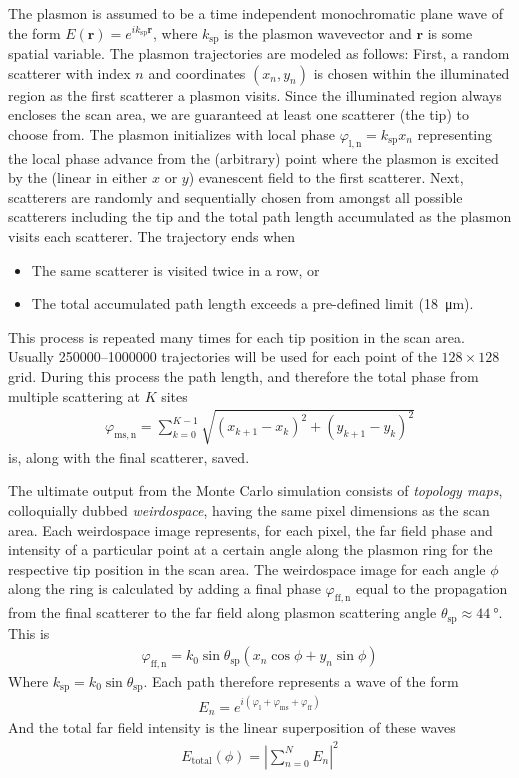 The plasmon is assumed to be a time independent monochromatic plane wave
of the form $E(\mathbf{r})=e^{ik_\mathrm{sp}\mathbf{r}}$, where
$k_\mathrm{sp}$ is the plasmon wavevector and $\mathbf{r}$ is some
spatial variable.  The plasmon trajectories are modeled as follows:
First, a random scatterer with index $n$ and coordinates $(x_n,y_n)$ is
chosen within the illuminated region as the first scatterer a plasmon
visits.  Since the illuminated region always encloses the scan area, we are
guaranteed at least one scatterer (the tip) to choose from.  The plasmon
initializes with local phase $\varphi_\mathrm{l,n}=k_\mathrm{sp}x_n$
representing the local phase advance from the (arbitrary) point where the
plasmon is excited by the (linear in either $x$ or $y$) evanescent field to
the first scatterer.  Next, scatterers are randomly and sequentially chosen
from amongst all possible scatterers including the tip and the total path
length accumulated as the plasmon visits each scatterer.  The trajectory
ends when
\begin{itemize}
\item The same scatterer is visited twice in a row, or
\item The total accumulated path length exceeds a pre-defined limit
(\SI{18}{\micro\meter}).  
\end{itemize}
This process is repeated many times for each tip position in the scan area.
Usually \numrange{250000}{1000000} trajectories will be used for each point
of the $128\times128$ grid.  During this process the path length, and
therefore the total phase from multiple scattering at $K$ sites
\begin{align}
\varphi_\mathrm{ms,n}=\sum_{k=0}^{K-1} \sqrt{(x_{k+1}-x_k)^2+(y_{k+1}-y_k)^2}
\end{align}
is, along with the final scatterer, saved.

The ultimate output from the Monte Carlo simulation consists of {\it
topology maps}, colloquially dubbed {\it weirdospace}, having the same pixel
dimensions as the scan area.  Each weirdospace image represents, for each
pixel, the far field phase and intensity of a particular point at a certain
angle along the plasmon ring for the respective tip position in the scan
area.  The weirdospace image for each angle $\phi$ along the ring is
calculated by adding a final phase $\varphi_\mathrm{ff,n}$ equal to the
propagation from the final scatterer to the far field along plasmon
scattering angle $\theta_\mathrm{sp}\approx \SI{44}{\degree}$.  This is 
\begin{align}
\varphi_\mathrm{ff,n} = k_0 \sin
\theta_\mathrm{sp}\left(x_n\cos\phi+y_n\sin\phi\right)
\end{align}
Where $k_\mathrm{sp}=k_0\sin \theta_\mathrm{sp}$.  Each path therefore
represents a wave of the form
\begin{align}
E_n=e^{i(\varphi_\mathrm{l}+\varphi_\mathrm{ms}+\varphi_\mathrm{ff})}
\end{align}
And the total far field intensity is the linear superposition of these
waves
\begin{align}
E_\mathrm{total}(\phi) = 
\left|\sum_{n=0}^{N} E_n\right|^2
\end{align}


